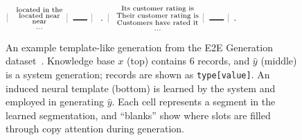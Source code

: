 \documentclass[11pt,a4paper]{article}
\begin{document}
\begin{figure}[h]
{{$\textcolor{gray}{|} \  $ $ \substack{\text{located in the}\\\text{located near}\\\text{near}\\ \dots}
\ \textcolor{gray}{|} $ $ \text{\rule{15pt}{1pt}} \ \textcolor{gray}{|} \  $ $ \text{.} $ $ \textcolor{gray}{|} \  $ $ \substack{\text{Its customer rating is}\\\text{Their customer rating is}\\\text{Customers have rated it}\\ \dots}
\ \textcolor{gray}{|} $ $ \text{\rule{15pt}{1pt}} \ \textcolor{gray}{|} $ . %
}}
    \caption{An example template-like generation from the E2E Generation dataset~\citep{novikova2017e2e}. Knowledge base $x$ (top) contains 6 records, and $\hat{y}$ (middle) is a system generation; records are shown as \texttt{type[value]}.
    An induced neural template (bottom) is learned by the system and employed in generating $\hat{y}$. Each cell represents a segment in the learned segmentation, and ``blanks'' show where slots are filled through copy attention during generation.
    }
    \label{fig:e2eex}
\end{figure}






    
\end{document}

